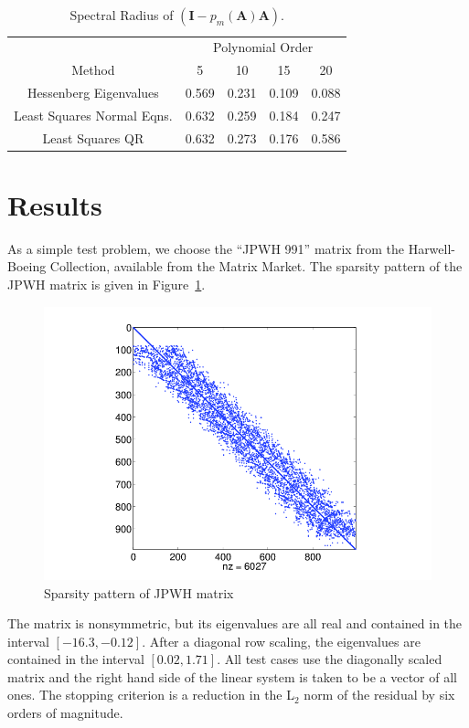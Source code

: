\documentclass[10pt]{article}
\newcommand{\bA}{\ensuremath{\mathbf{A}}}
\newcommand{\bI}{\ensuremath{\mathbf{I}}}
\begin{document}
\begin{table}
\centering
\caption{Spectral Radius of $\left( \bI - p_m(\bA) \bA \right)$.}
\label{tab:gmres_poly}
\begin{tabular}{ccccc}
\toprule
& \multicolumn{4}{c}{Polynomial Order} \\
\cmidrule(r){2-5}
Method & 5 & 10 & 15 & 20 \\
\midrule
Hessenberg Eigenvalues     & 0.569 & 0.231 & 0.109 & 0.088 \\
Least Squares Normal Eqns. & 0.632 & 0.259 & 0.184 & 0.247 \\
Least Squares QR           & 0.632 & 0.273 & 0.176 & 0.586 \\
\bottomrule
\end{tabular}
\end{table}

\section{Results}

As a simple test problem, we choose the ``JPWH 991'' matrix from
the Harwell-Boeing Collection, available from the Matrix Market.
The sparsity pattern of the JPWH matrix is given in Figure~\ref{fig:jpwh_sparsity}.
\begin{figure}
\centering
\includegraphics[width=4.5in]{jpwh_sparsity}
\caption{Sparsity pattern of JPWH matrix \label{fig:jpwh_sparsity}}
\end{figure}
The matrix is nonsymmetric, but its eigenvalues are all real and
contained in the interval $[-16.3,-0.12]$.  After a diagonal row
scaling, the eigenvalues are contained in the interval $[0.02,1.71]$.
All test cases use the diagonally scaled matrix and the right
hand side of the linear system is taken to be a vector of all ones.
The stopping criterion is a reduction in the L$_2$ norm of the residual
by six orders of magnitude.
\end{document}
